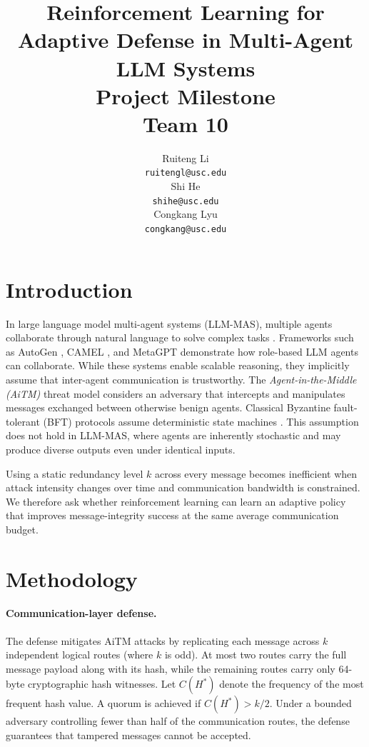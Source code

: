 \documentclass{article}
\title{Reinforcement Learning for Adaptive Defense in Multi-Agent LLM Systems \\ \vspace{0.5em} \Large Project Milestone \\ \large Team 10}
\author{%
  Ruiteng Li \\
  \texttt{ruitengl@usc.edu} \\
  \And
  Shi He \\
  \texttt{shihe@usc.edu} \\
  \And
  Congkang Lyu \\
  \texttt{congkang@usc.edu} \\
}
\begin{document}
\maketitle

\section{Introduction}
In large language model multi-agent systems ({LLM-MAS}), multiple agents collaborate through natural language to solve complex tasks \citep{wang2024survey, xi2023rise}. Frameworks such as {AutoGen} \citep{wu2023autogen}, {CAMEL} \citep{li2023camel}, and {MetaGPT} \citep{hong2023metagpt} demonstrate how role-based {LLM} agents can collaborate. While these systems enable scalable reasoning, they implicitly assume that inter-agent communication is trustworthy. The \textit{Agent-in-the-Middle ({AiTM})} threat model \citep{he2025redteaming} considers an adversary that intercepts and manipulates messages exchanged between otherwise benign agents. Classical Byzantine fault-tolerant ({BFT}) protocols assume deterministic state machines \citep{lamport1982byzantine, zheng2025bft}. This assumption does not hold in {LLM-MAS}, where agents are inherently stochastic and may produce diverse outputs even under identical inputs.

Using a static redundancy level $k$ across every message becomes inefficient when attack intensity changes over time and communication bandwidth is constrained. We therefore ask whether reinforcement learning can learn an adaptive policy that improves message-integrity success at the same average communication budget.

\section{Methodology}
\paragraph{Communication-layer defense.}
The defense mitigates {AiTM} attacks by replicating each message across $k$ independent logical routes (where $k$ is odd). At most two routes carry the full message payload along with its hash, while the remaining routes carry only 64-byte cryptographic hash witnesses. Let $C(H^*)$ denote the frequency of the most frequent hash value. A quorum is achieved if $C(H^*) > k/2$. Under a bounded adversary controlling fewer than half of the communication routes, the defense guarantees that tampered messages cannot be accepted.
\end{document}
